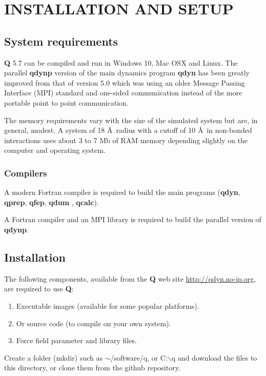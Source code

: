 \documentclass[a4paper,10pt]{article}
\begin{document}
\section{INSTALLATION AND SETUP}
\subsection{System requirements} 
\textbf{Q}  5.7 can  be compiled  and run  in Windows  10, Mac  OSX and
Linux.   The  parallel \textbf{qdynp}  version  of  the main  dynamics
program \textbf{qdyn} has  been greatly improved from  that of version
5.0 which was using an  older Message Passing Interface (MPI) standard
and  one-sided communication  instead of  the more  portable point  to
point communication.

The memory requirements vary with the size of the simulated system but
are, in general, modest.  A system of  18 \AA ~radius with a cutoff of
10 \AA ~in non-bonded interactions uses about  3 to 7 Mb of RAM memory
depending slightly on the computer and operating system.

\subsubsection{Compilers} 
A  modern Fortran  compiler is  required  to build  the main  programs
(\textbf{qdyn},   \textbf{qprep},   \textbf{qfep},   \textbf{qdum}   ,
\textbf{qcalc}).

A  Fortran compiler  and  an  MPI library  is  required  to build  the
parallel version of \textbf{qdynp}.

\subsection{Installation}
The following components, available from the \textbf{Q} web site
\url{http://qdyn.no-ip.org}, are required to use \textbf{Q}:
\begin{enumerate}
\item Executable images (available for some popular platforms).
\item Or source code (to compile on your own system).
\item Force field parameter and library files.
\end{enumerate}
Create a folder (mkdir) such as $\sim$/software/q,  or C:$\backslash$q
and download the files to this directory, or clone them from the
github repository.
\end{document}
